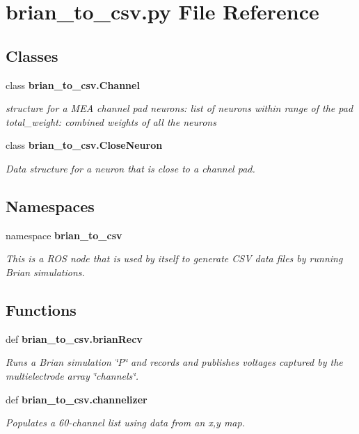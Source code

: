 \section{brian\-\_\-to\-\_\-csv.\-py \-File \-Reference}
\label{brian__to__csv_8py}
\subsection*{\-Classes}
\begin{DoxyCompactItemize}
\item 
class {\bf brian\-\_\-to\-\_\-csv.\-Channel}
\begin{DoxyCompactList}\small\item\em structure for a \-M\-E\-A channel pad neurons\-: list of neurons within range of the pad total\-\_\-weight\-: combined weights of all the neurons \end{DoxyCompactList}\item 
class {\bf brian\-\_\-to\-\_\-csv.\-Close\-Neuron}
\begin{DoxyCompactList}\small\item\em \-Data structure for a neuron that is close to a channel pad. \end{DoxyCompactList}\end{DoxyCompactItemize}
\subsection*{\-Namespaces}
\begin{DoxyCompactItemize}
\item 
namespace {\bf brian\-\_\-to\-\_\-csv}
\begin{DoxyCompactList}\small\item\em \-This is a \-R\-O\-S node that is used by itself to generate \-C\-S\-V data files by running \-Brian simulations. \end{DoxyCompactList}\end{DoxyCompactItemize}
\subsection*{\-Functions}
\begin{DoxyCompactItemize}
\item 
def {\bf brian\-\_\-to\-\_\-csv.\-brian\-Recv}
\begin{DoxyCompactList}\small\item\em \-Runs a \-Brian simulation \char`\"{}\-P\char`\"{} and records and publishes voltages captured by the multielectrode array \char`\"{}channels\char`\"{}. \end{DoxyCompactList}\item 
def {\bf brian\-\_\-to\-\_\-csv.\-channelizer}
\begin{DoxyCompactList}\small\item\em \-Populates a 60-\/channel list using data from an x,y map. \end{DoxyCompactList}\end{DoxyCompactItemize}
